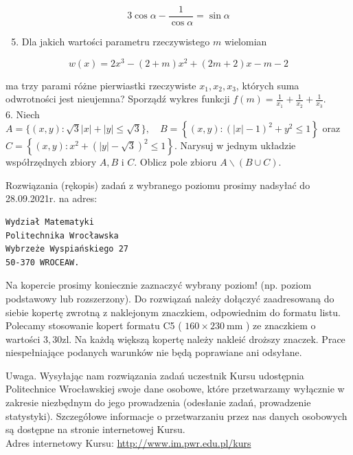 \documentclass[10pt]{article}
\begin{document}
$$
3 \cos \alpha-\frac{1}{\cos \alpha}=\sin \alpha
$$

\begin{enumerate}
  \setcounter{enumi}{4}
  \item Dla jakich wartości parametru rzeczywistego $m$ wielomian
\end{enumerate}

$$
w(x)=2 x^{3}-(2+m) x^{2}+(2 m+2) x-m-2
$$

ma trzy parami różne pierwiastki rzeczywiste $x_{1}, x_{2}, x_{3}$, których suma odwrotności jest nieujemna? Sporządź wykres funkcji $f(m)=\frac{1}{x_{1}}+\frac{1}{x_{2}}+\frac{1}{x_{3}}$.\\
6. Niech $A=\{(x, y): \sqrt{3}|x|+|y| \leqslant \sqrt{3}\}, \quad B=\left\{(x, y):(|x|-1)^{2}+y^{2} \leqslant 1\right\}$ oraz $C=\left\{(x, y): x^{2}+(|y|-\sqrt{3})^{2} \leqslant 1\right\}$. Narysuj w jednym układzie współrzędnych zbiory $A, B$ i $C$. Oblicz pole zbioru $A \backslash(B \cup C)$.

Rozwiązania (rękopis) zadań z wybranego poziomu prosimy nadsyłać do 28.09.2021r. na adres:

\begin{verbatim}
Wydział Matematyki
Politechnika Wrocławska
Wybrzeże Wyspiańskiego 27
50-370 WROCEAW.
\end{verbatim}

Na kopercie prosimy koniecznie zaznaczyć wybrany poziom! (np. poziom podstawowy lub rozszerzony). Do rozwiązań należy dołączyć zaadresowaną do siebie kopertę zwrotną z naklejonym znaczkiem, odpowiednim do formatu listu. Polecamy stosowanie kopert formatu C5 ( $160 \times 230 \mathrm{~mm}$ ) ze znaczkiem o wartości $3,30 \mathrm{zl}$. Na każdą większą kopertę należy nakleić droższy znaczek. Prace niespełniające podanych warunków nie będą poprawiane ani odsyłane.

Uwaga. Wysyłając nam rozwiązania zadań uczestnik Kursu udostępnia Politechnice Wrocławskiej swoje dane osobowe, które przetwarzamy wyłącznie w zakresie niezbędnym do jego prowadzenia (odesłanie zadań, prowadzenie statystyki). Szczegółowe informacje o przetwarzaniu przez nas danych osobowych są dostępne na stronie internetowej Kursu.\\
Adres internetowy Kursu: \href{http://www.im.pwr.edu.pl/kurs}{http://www.im.pwr.edu.pl/kurs}
\end{document}
